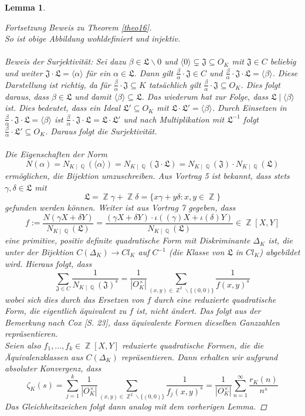 \documentclass[10pt,a4paper]{article}
\theoremstyle{plain}
\newtheorem{lem}[thm]{Lemma}
\theoremstyle{definition}
\theoremstyle{remark}
\DeclareMathOperator{\Q}{\mathbb{Q}}
\DeclareMathOperator{\Z}{\mathbb{Z}}
\begin{document}
\begin{lem}
\begin{proof}[Fortsetzung Beweis zu Theorem \ref{theo16}]
\\
So ist obige Abbildung wohldefiniert und injektiv.\\
\\
Beweis der Surjektivität:
Sei dazu $\beta \in \mathfrak{L}\backslash{0}$ und  $\langle 0 \rangle \subsetneq \mathfrak{J} \subseteq O_K$ mit $\mathfrak{J} \in C$ beliebig und weiter $\mathfrak{J\cdot L}= \langle \alpha \rangle$ für ein $\alpha \in \mathfrak{L}$. Dann gilt $\frac{\beta}{\alpha} \cdot \mathfrak{J} \in C$ und $\frac{\beta}{\alpha} \cdot \mathfrak{J\cdot L} = \langle \beta\rangle$. Diese Darstellung ist richtig, da für $\frac{\beta}{\alpha} \cdot \mathfrak{J} \subseteq K$ tatsächlich gilt $\frac{\beta}{\alpha} \cdot \mathfrak{J} \subseteq O_K$. Dies folgt daraus, dass $\beta \in \mathfrak{L}$ und damit $\langle \beta \rangle \subseteq \mathfrak{L}$. Das wiederum hat zur Folge, dass $\mathfrak{L}\mid \langle \beta \rangle$ ist. Dies bedeutet, dass ein Ideal $\mathfrak{L'}\subseteq O_K$ mit $\mathfrak{L\cdot L'}= \langle \beta \rangle$. Durch Einsetzen in $\frac{\beta}{\alpha} \cdot \mathfrak{J\cdot L} = \langle \beta\rangle$ ist $\frac{\beta}{\alpha} \cdot \mathfrak{J\cdot L} = \mathfrak{L \cdot L'} $ und nach Multiplikation mit $\mathfrak{L^{-1}}$ folgt $\frac{\beta}{\alpha} \cdot \mathfrak{L'}\subseteq O_K$. Daraus folgt die Surjektivität.\\
\\
Die Eigenschaften der Norm $$N(\alpha)= N_{K\mid \Q}(\langle \alpha \rangle)=N_{K\mid \Q}(\mathfrak{J\cdot L})=N_{K\mid \Q}(\mathfrak{J})\cdot N_{K\mid \Q}(\mathfrak{L})$$ ermöglichen, die Bijektion umzuschreiben. Aus Vortrag 5 ist bekannt, dass stets $\gamma, \delta \in \mathfrak{L}$ mit $$\mathfrak{L}= \Z\gamma+\Z\delta = \{x\gamma+y\delta\colon x,y \in \Z\}$$ gefunden werden können. Weiter ist aus Vortrag 7 gegeben, dass $$f:=\frac{N(\gamma X+\delta Y)}{N_{K\mid \Q}(\mathfrak{L})}=\frac{(\gamma X + \delta Y)\cdot \iota((\gamma)X+\iota(\delta)Y)}{N_{K\mid \Q}(\mathfrak{L})} \in \Z[X,Y]$$eine primitive, positiv definite quadratische Form mit Diskriminante $\Delta_K$ ist, die unter der Bijektion $C(\Delta_K)\rightarrow Cl_K$ auf $C^{-1}$ (die Klasse von $\mathfrak{L}$ in $Cl_K$) abgebildet wird. Hieraus folgt, dass $$\sum_{\mathfrak{J}\in C}\frac{1}{N_{K\mid \Q }(\mathfrak{J})^s}=\frac{1}{|O_K^{\times}|}\sum_{(x,y)\in \Z^2\backslash \{ (0,0)\}}\frac{1}{f(x,y)^s}$$wobei sich dies durch das Ersetzen von $f$ durch eine reduzierte quadratische Form, die eigentlich äquivalent zu $f$ ist, nicht ändert. Das folgt aus der Bemerkung nach Cox \cite{Cox}[S. 23], dass äquivalente Formen dieselben Ganzzahlen repräsentieren.
\\
Seien also $f_1,...,f_k \in \Z[X,Y]$ reduzierte quadratische Formen, die die Äquivalenzklassen aus $C(\Delta_K)$ repräsentieren. Dann erhalten wir aufgrund absoluter Konvergenz, dass $$\zeta_K(s) = \sum_{j=1}^{k}\frac{1}{|O_K^{\times}|}\sum_{(x,y) \in \Z^2 \backslash \{(0,0)\}}\frac{1}{f_j(x,y)^s}=\frac{1}{|O_K^{\times}|}\sum_{n=1}^{\infty}\frac{r_K(n)}{n^s}$$
Das Gleichheitszeichen folgt dann analog mit dem vorherigen Lemma.
\end{proof}
\end{lem}
 
\end{document}
